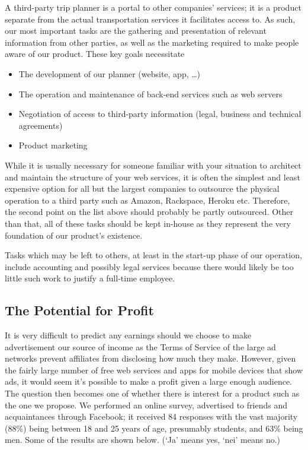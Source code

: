 A third-party trip planner is a portal to other companies' services; it is a
product separate from the actual transportation services it facilitates access
to. As such, our most important tasks are the gathering and presentation of
relevant information from other parties, as well as the marketing required to
make people aware of our product. These key goals necessitate

\begin{itemize}
    \item The development of our planner (website, app, \ldots)
    \item The operation and maintenance of back-end services such as web servers
    \item Negotiation of access to third-party information (legal, business and
          technical agreements)
    \item Product marketing
\end{itemize}

While it is usually necessary for someone familiar with your situation to
architect and maintain the structure of your web services, it is often the
simplest and least expensive option for all but the largest companies to
outsource the physical operation to a third party such as Amazon, Rackspace,
Heroku etc. Therefore, the second point on the list above should probably be
partly outsourced. Other than that, all of these tasks should be kept in-house
as they represent the very foundation of our product's existence.

Tasks which may be left to others, at least in the start-up phase of our
operation, include accounting and possibly legal services because there would
likely be too little such work to justify a full-time employee.

\subsection{The Potential for Profit}

It is very difficult to predict any earnings should we choose to make
advertisement our source of income as the Terms of Service of the large ad
networks prevent affiliates from disclosing how much they make. However, given
the fairly large number of free web services and apps for mobile devices that
show ads, it would seem it's possible to make a profit given a large enough
audience. The question then becomes one of whether there is interest for a
product such as the one we propose. We performed an online survey, advertised
to friends and acquaintances through Facebook; it received 84 responses with
the vast majority (88\%) being between 18 and 25 years of age, presumably
students, and 63\% being men. Some of the results are shown below. (`Ja' means
yes, `nei' means no.)

